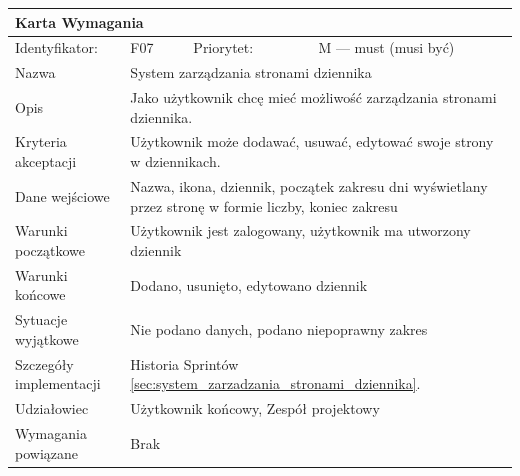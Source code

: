 \documentclass[a4paper,11pt]{report}
\begin{document}
		\begin{tabular}{|p{3cm}|p{2cm}|p{2cm}|p{6cm}|}
		\hline
		\multicolumn{4}{|p{12 cm}|}{Karta Wymagania}\\
		\hline
		Identyfikator: & F07 & Priorytet: & M — must (musi być)\\
		\hline
		Nazwa & \multicolumn{3}{|p{10 cm}|}{System zarządzania stronami dziennika}\\
		\hline
		Opis & \multicolumn{3}{|p{10 cm}|}{Jako użytkownik chcę mieć możliwość zarządzania stronami dziennika.}\\
		\hline
		Kryteria akceptacji & \multicolumn{3}{|p{10 cm}|}{Użytkownik może dodawać, usuwać, edytować swoje strony w dziennikach.}\\
		\hline
		Dane wejściowe & \multicolumn{3}{|p{10 cm}|}{Nazwa, ikona, dziennik, początek zakresu dni wyświetlany przez stronę w formie liczby, koniec zakresu}\\
		\hline
		Warunki początkowe & \multicolumn{3}{|p{10 cm}|}{Użytkownik jest zalogowany, użytkownik ma utworzony dziennik}\\
		\hline
		Warunki końcowe & \multicolumn{3}{|p{10 cm}|}{Dodano, usunięto, edytowano dziennik}\\
		\hline
		Sytuacje wyjątkowe & \multicolumn{3}{|p{10 cm}|}{Nie podano danych, podano niepoprawny zakres}\\
		\hline
		Szczegóły implementacji & \multicolumn{3}{|p{10 cm}|}{Historia Sprintów \ref{sec:system_zarzadzania_stronami_dziennika}.}\\
		\hline
		Udziałowiec & \multicolumn{3}{|p{10 cm}|}{Użytkownik końcowy, Zespół projektowy}\\
		\hline
		Wymagania powiązane & \multicolumn{3}{|p{10 cm}|}{Brak}\\
		\hline
		\end{tabular}
		\newline
		\vspace*{0,2 cm}
		\newline
\end{document}
